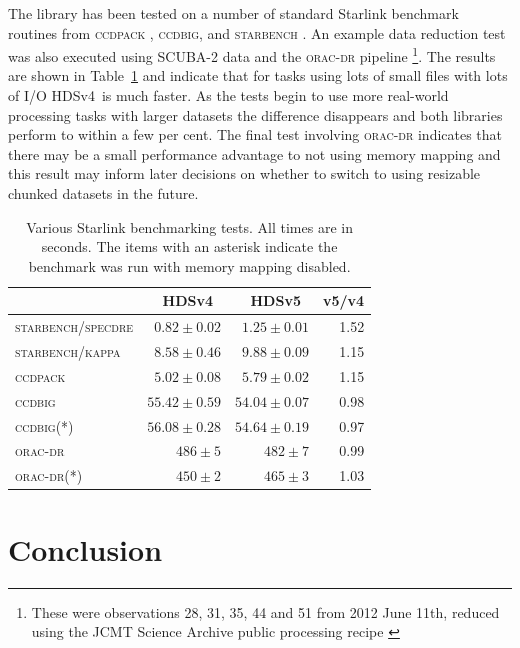 \documentclass[final,authoryear,5p,times,twocolumn]{elsarticle}
\newcommand{\new}{HDSv5}
\newcommand{\old}{HDSv4}
\begin{document}
The library has been tested on a number of standard Starlink benchmark
routines from \textsc{ccdpack} \citep[][]{SUN139},
\textsc{ccdbig}, and \textsc{starbench} \citep{SSN23}. An example data reduction
test was also executed using SCUBA-2 data and the \textsc{orac-dr}
pipeline \citep[][]{2015oracdr}\footnote{These were
  observations 28, 31, 35, 44 and 51  from 2012 June 11th, reduced
  using the JCMT Science Archive public processing recipe
  \citep{2014SPIE9152-93}}. The results are shown in
Table~\ref{tab:bench} and indicate that for tasks using lots of small
files with lots of I/O \old\ is much faster. As the tests begin to use
more real-world processing tasks with larger datasets the difference
disappears and both libraries perform to within a few per cent. The
final test involving \textsc{orac-dr} indicates that there may be a
small performance advantage to not using memory mapping and this
result may inform later decisions on whether to switch to using
resizable chunked datasets in the future.

\begin{table}
\caption{Various Starlink benchmarking tests. All times are in
  seconds. The items with an asterisk indicate the benchmark was run
  with memory mapping disabled.}
\label{tab:bench}
\begin{center}
\begin{tabular}{lrrr}
\hline
   & \old\ & \new\ & v5/v4 \\ \hline
\textsc{starbench/specdre} & $0.82\pm0.02$ & $1.25\pm0.01$ & 1.52\\
\textsc{starbench/kappa} & $8.58\pm0.46$ & $9.88\pm0.09$ & 1.15\\
\textsc{ccdpack} & $5.02\pm0.08$ & $5.79\pm0.02$ & 1.15\\
\textsc{ccdbig} & $55.42\pm0.59$ & $54.04\pm0.07$ & 0.98\\
\textsc{ccdbig}(*) & $56.08\pm0.28$ & $54.64\pm0.19$ & 0.97\\
\textsc{orac-dr} & $486\pm5$ & $482\pm7$ & 0.99\\
\textsc{orac-dr}(*) & $450\pm2$ & $465\pm3$ & 1.03\\
\hline
\end{tabular}
\end{center}
\end{table}




\section{Conclusion}
\end{document}
